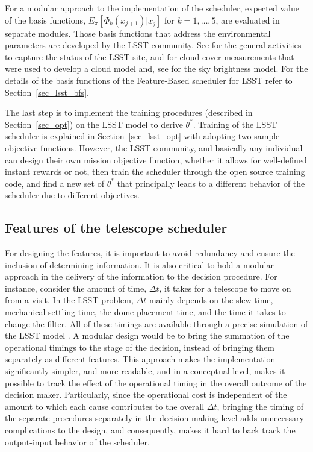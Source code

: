 \documentclass[12pt]{aastex62}
\theoremstyle{definition}
\begin{document}
For a modular approach to the implementation of the scheduler, expected value of the basis functions, $E_{\pi}[\Phi_k(x_{j+1})|x_j]$ for $k=1,\dots, 5$, are evaluated in separate modules. Those basis functions that address the environmental parameters are developed by the LSST community. See \citep{2014SPIE.9145E..1AG} for the general activities to capture the status of the LSST site, \citep{sebag2008lsst} and \citep{sebag2007lsst} for cloud cover measurements that were used to develop a cloud model and, see \citep{yoachim2016optical} for the sky brightness model. For the details of the basis functions of the Feature-Based scheduler for LSST refer to Section~\ref{sec_lsst_bfs}.

The last step is to implement the training procedures (described in Section~\ref{sec_opt}) on the LSST model to derive $\theta^*$. Training of the LSST scheduler is explained in Section~\ref{sec_lsst_opt} with adopting two sample objective functions. However, the LSST community, and basically any individual can design their own mission objective function, whether it allows for well-defined instant rewards or not, then train the scheduler through the open source training code, and find a new set of $\theta^*$ that principally leads to a different behavior of the scheduler due to different objectives.


\subsection{Features of the telescope scheduler}\label{sec_lsst_features}

For designing the features, it is important to avoid redundancy and ensure the inclusion of determining information. It is also critical to hold a modular approach in the delivery of the information to the decision procedure. For instance, consider the amount of time, $\Delta t$, it takes for a telescope to move on from a visit. In the LSST problem, $\Delta t$ mainly depends on the slew time, mechanical settling time, the dome placement time, and the time it takes to change the filter. All of these timings are available through a precise simulation of the LSST model \citep{delgado2014lsst}. A modular design would be to bring the summation of the operational timings to the stage of the decision, instead of bringing them separately as different features. This approach makes the implementation significantly simpler, and more readable, and in a conceptual level, makes it possible to track the effect of the operational timing in the overall outcome of the decision maker. Particularly, since the operational cost is independent of the amount to which each cause contributes to the overall $\Delta t$, bringing the timing of the separate procedures separately in the decision making level adds unnecessary complications to the design, and consequently, makes it hard to back track the output-input behavior of the scheduler. 
\end{document}
